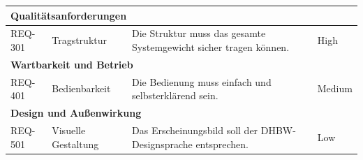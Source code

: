 \begin{longtable}{|p{1.7cm}|p{4.2cm}|p{8.8cm}|p{1.9cm}|}
	\multicolumn{4}{|l|}{\textbf{Qualitätsanforderungen}} \\
	\hline
	REQ-301 & Tragstruktur & Die Struktur muss das gesamte Systemgewicht sicher tragen können. & High \\
	\hline


	\multicolumn{4}{|l|}{\textbf{Wartbarkeit und Betrieb}} \\
	\hline
	REQ-401 & Bedienbarkeit & Die Bedienung muss einfach und selbsterklärend sein. & Medium \\

	
	\multicolumn{4}{|l|}{\textbf{Design und Außenwirkung}} \\
	\hline
	REQ-501 & Visuelle Gestaltung & Das Erscheinungsbild soll der DHBW-Designsprache entsprechen. & Low \\
	\hline

	
\end{longtable}

